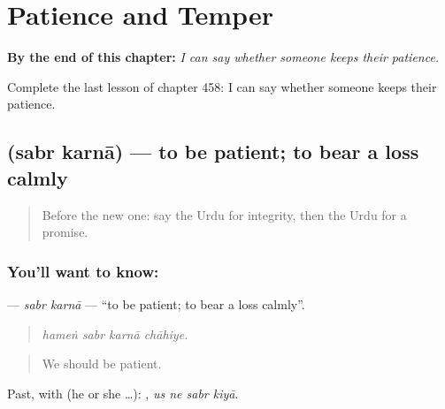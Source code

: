 
\chapter{Patience and Temper}
\label{ch:ur-patience-and-temper}

\begin{chapteropening}
\textbf{By the end of this chapter:} \emph{I can say whether someone keeps their patience.}

Complete the last lesson of chapter 458: I can say whether someone keeps their patience.
\end{chapteropening}

\section[\texorpdfstring{\ur{صبر} \ur{کرنا} (sabr karnā)}{صبر کرنا (sabr karnā)}]{  (sabr karnā) — to be patient; to bear a loss calmly}

\label{lesson:UR-C458-sabr-karna}



\begin{quote}
Before the new one: say the Urdu for integrity, then the Urdu for a promise.
\end{quote}

\subsection*{You'll want to know:  }
\textbf{ } — \emph{sabr karnā} — \textquotedblleft{}to be patient; to bear a loss calmly\textquotedblright{}.

\begin{quote}
   
\end{quote}

\begin{quote}
\emph{hameṅ sabr karnā chāhiye.}
\end{quote}

\begin{quote}
We should be patient.
\end{quote}

Past, with  (he or she …):    , \emph{us ne sabr kiyā}.

